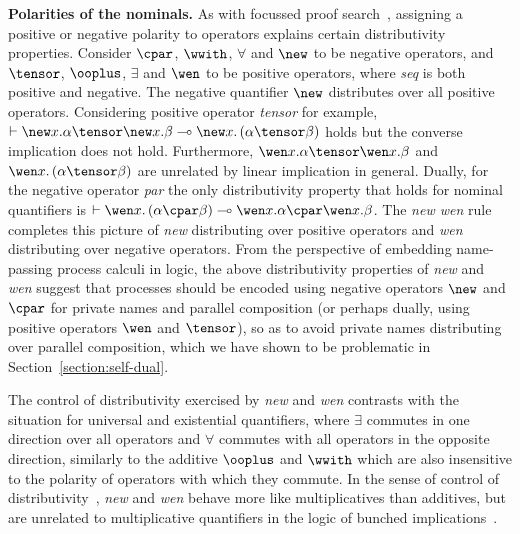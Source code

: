 \documentclass[UKenglish,acmsmall,authorversion]{acmart}
\theoremstyle{plain}
\begin{document}
\textbf{Polarities of the nominals.}
As with focussed proof search~\cite{Andreoli1992,Chaudhuri2011}, assigning a positive or negative polarity to operators explains certain distributivity properties.
Consider $\cpar$, $\wwith$, $\forall$ and $\new$ to be negative operators, %
and $\tensor$, $\ooplus$, $\exists$ and $\wen$ to be positive operators, where \textit{seq} is both positive and negative. The negative quantifier $\new$ distributes over all positive operators. 
Considering positive operator \textit{tensor} %
for example, $\vdash \new x .\alpha \tensor \new x. \beta  \multimap \new x. \left( \alpha \tensor \beta \right)$ holds but the converse implication does not hold. Furthermore, $\wen x. \alpha \tensor \wen x. \beta$ and $\wen x .\left(\alpha \tensor \beta\right)$ are unrelated by linear implication in general.
Dually, for the negative operator \textit{par} the only distributivity property that holds for nominal quantifiers is $\vdash \wen x .\left( \alpha \cpar \beta \right) \multimap \wen x .\alpha \cpar \wen x .\beta$.
The \textit{new wen} rule completes this picture of \textit{new} distributing over positive operators and \textit{wen} distributing over negative operators.
From the perspective of embedding name-passing process calculi in logic, the above distributivity properties of \textit{new} and \textit{wen} suggest that processes should be
encoded using negative operators $\new$ and $\cpar$ for private names and parallel composition
(or perhaps dually, using positive operators $\wen$ and $\tensor$),
so as to avoid private names distributing over parallel composition,
which we have shown to be problematic in Section~\ref{section:self-dual}.



The control of distributivity exercised by \textit{new} and \textit{wen} contrasts with the situation for universal and existential quantifiers, where $\exists$ commutes in one direction over all operators and $\forall$ commutes with all operators in the opposite direction, similarly to the additive $\ooplus$ and $\wwith$ which are also  insensitive to the polarity of operators with which they commute.
In the sense of control of distributivity~\cite{Blute2012}, \textit{new} and \textit{wen} behave more like multiplicatives than additives, but are unrelated to multiplicative quantifiers in the logic of bunched implications~\cite{BI}.
\end{document}

